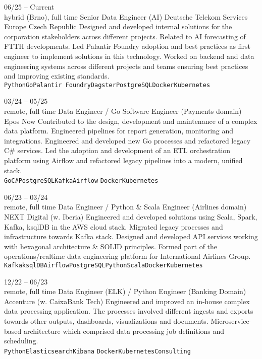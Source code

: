 \documentclass[10pt]{developercv} %
\begin{document}
\begin{entrylist}
	\entry
		{06/25 -- Current\\\footnotesize{hybrid (Brno), full time}}
		{Senior Data Engineer (AI)}
		{Deutsche Telekom Services Europe Czech Republic}
		{
			Designed and developed internal solutions for the corporation stakeholders across different projects. Related to AI forecasting of FTTH developments.
			Led Palantir Foundry adoption and best practices as first engineer to implement solutions in this technology.
			Worked on backend and data engineering systems across different projects and teams ensuring best practices and improving existing standards.
			\\
		\texttt{Python}\slashsep\texttt{Go}\slashsep\texttt{Palantir Foundry}\slashsep\texttt{Dagster}\slashsep\texttt{PostgreSQL}\slashsep\texttt{Docker}\slashsep\texttt{Kubernetes}}

	\entry
		{03/24 -- 05/25\\\footnotesize{remote, full time}}
		{Data Engineer / Go Software Engineer (Payments domain)}
		{Epos Now}
		{
			Contributed to the design, development and maintenance of a complex data platform.
			Engineered pipelines for report generation, monitoring and integrations. Engineered and developed new Go processes and refactored legacy C\# services.
			Led the adoption and development of an ETL orchestration platform using Airflow and refactored legacy pipelines into a modern, unified stack.
			\\
		\texttt{Go}\slashsep\texttt{C\#}\slashsep\texttt{PostgreSQL}\slashsep\texttt{Kafka}\slashsep\texttt{Airflow}
		\slashsep\texttt{Docker}\slashsep\texttt{Kubernetes}}
	
	\entry
		{06/23 -- 03/24\\\footnotesize{remote, full time}}
		{Data Engineer / Python \& Scala Engineer (Airlines domain)}
		{NEXT Digital (w. Iberia)}
		{
			Engineered and developed solutions using Scala, Spark, Kafka, ksqlDB in the AWS cloud stack.
			Migrated legacy processes and infrastructure towards Kafka stack. Designed and developed API services
			working with hexagonal architecture \& SOLID principles. Formed part of the operations/realtime data
			engineering platform for International Airlines Group. 
			\\
		\texttt{Kafka}\slashsep\texttt{ksqlDB}\slashsep\texttt{Airflow}\slashsep\texttt{PostgreSQL}\slashsep\texttt{Python}\slashsep\texttt{Scala}\slashsep\texttt{Docker}\slashsep\texttt{Kubernetes}}
	
	\entry
		{12/22 -- 06/23\\\footnotesize{remote, full time}}
		{Data Engineer (ELK) / Python Engineer (Banking Domain)}
		{Accenture (w. CaixaBank Tech)}
		{
			Engineered and improved an in-house complex data processing application.
			The processes involved different ingests and exports towards other outputs,
			dashboards, visualizations and documents.
			Microservice-based architecture which comprised data processing job
			definitions and scheduling.\\
		\texttt{Python}\slashsep\texttt{Elasticsearch}\slashsep\texttt{Kibana}
		\slashsep\texttt{Docker}\slashsep\texttt{Kubernetes}\slashsep\texttt{Consulting}}
	

\end{entrylist}
\end{document}
